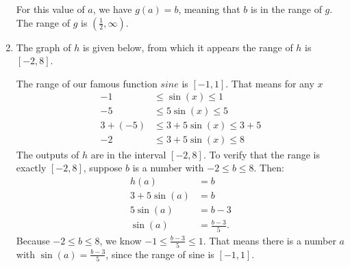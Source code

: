 \documentclass[nooutcomes]{ximera}
\begin{document}
\begin{example}
\begin{explanation}
\begin{enumerate}
					For this value of $a$, we have $g\left( a \right) = b$, meaning that $b$ is in the range of $g$.
					The range of $g$ is $\left( \frac{1}{2}, \infty\right)$.

				\item The graph of $h$ is given below, from which it appears the range of $h$ is $[-2, 8]$.
				
					\begin{image}
					\end{image}
				
				The range of our famous function $sine$ is $[-1, 1]$. That means for any $x$
					\begin{align*}
						-1 &\leq \sin(x) \leq 1\\
						-5 &\leq 5\sin(x) \leq 5\\
						3+(-5) &\leq 3+5\sin(x) \leq 3+5\\
						-2 &\leq 3+5\sin(x) \leq 8
					\end{align*}
					The outputs of $h$ are in the interval $[-2, 8]$. To verify that the range is exactly $[-2, 8]$, suppose 
					$b$ is a number with $-2 \leq b \leq 8$. Then:
					\begin{align*}
						h(a) &= b\\
						3 + 5\sin(a) &= b\\
						5\sin(a)& = b-3\\
						\sin(a) &= \frac{b-3}{5}.
					\end{align*}
					Because $-2 \leq b \leq 8$, we know $-1 \leq \frac{b-3}{5} \leq 1$. That means there is a number $a$ with $\sin(a) = \frac{b-3}{5}$, since the range of 
					sine is $[-1,1]$.
					

\end{enumerate}
\end{explanation}
\end{example}
\end{document}
